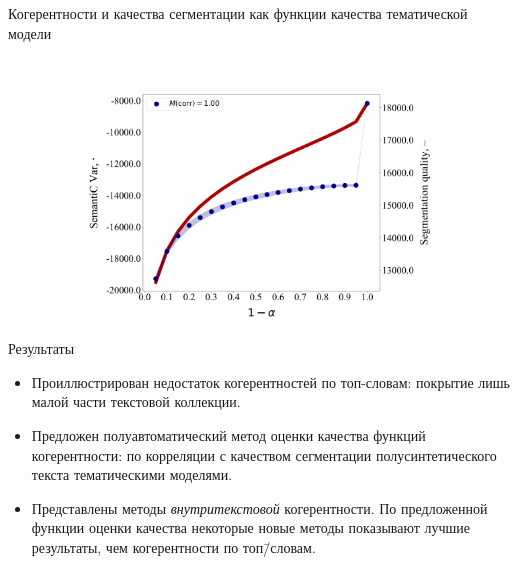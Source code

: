 \documentclass[russian]{beamer}
\begin{document}
\begin{frame}{Когерентности и качества сегментации как функции качества тематической модели}
\begin{figure}[h]
\begin{subfigure}[t]{0.48\textwidth}
    \end{subfigure}
    ~
    \begin{subfigure}[t]{0.48\textwidth}
      \includegraphics[width=\linewidth]{semantic_var-iteration.jpg}
    \end{subfigure}
  \end{figure}
\end{frame}


\begin{frame}{Результаты}
  \begin{itemize}\setlength\itemsep{0.5cm}
  \item Проиллюстрирован недостаток когерентностей по топ-словам: покрытие лишь малой части текстовой коллекции.

  \item Предложен полуавтоматический метод оценки качества функций когерентности: по корреляции с качеством сегментации полусинтетического текста тематическими моделями.

  \item Представлены методы \emph{внутритекстовой} когерентности.
    По предложенной функции оценки качества некоторые новые методы показывают лучшие результаты, чем когерентности по топ\=/словам.
  \end{itemize}
\end{frame}
\end{document}
